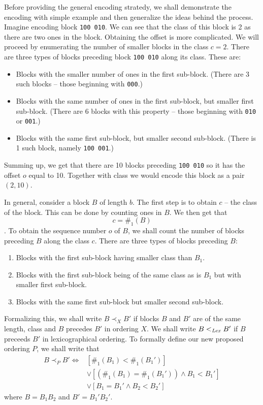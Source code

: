 Before providing the general encoding stratedy, we shall demonstrate the encoding with
simple example and then generalize the ideas behind the process. Imagine encoding
block {\tt 100 010}. We can see that the class of this block is 2 as there are two ones in
the block. Obtaining the offset is more complicated. We will proceed by enumerating the
number of smaller blocks in the class $c=2$. There are three types of blocks preceding
block {\tt 100 010} along its class. These are:

\begin{itemize}
    \item Blocks with the smaller number of ones in the first sub-block.
    (There are 3 such blocks -- those beginning with {\tt 000}.)
    \item Blocks with the same number of ones in the first sub-block, but smaller first sub-block.
    (There are 6 blocks with this property -- those beginning with {\tt 010} or {\tt 001}.)
    \item Blocks with the same first sub-block, but smaller second sub-block.
    (There is 1 such block, namely {\tt 100 001}.)
\end{itemize}

Summing up, we get that there are 10 blocks preceding {\tt 100 010} so it has the offset $o$
equal to 10. Together with class we would encode this block as a pair $(2, 10)$.

In general, consider a block $B$ of length $b$. The first step is to obtain
$c$ -- the class of the block. This can be done by counting ones in $B$. We
then get that $$c=\#_1(B)$$. To obtain the sequence number $o$ of $B$, we shall
count the number of blocks preceding $B$ along the class $c$. There are three
types of blocks preceding $B$:

\begin{enumerate}
    \item Blocks with the first sub-block having smaller class than $B_1$.
    \label{chapter3:encoding:1}
    \item Blocks with the first sub-block being of the same class as is $B_1$
    but with smaller first sub-block. \label{chapter3:encoding:2}
    \item Blocks with the same first sub-block but smaller second sub-block.
    \label{chapter3:encoding:3}
\end{enumerate}

Formalizing this, we shall write $B\prec_X B'$ if blocks $B$ and $B'$ are of
the same length, class and $B$ precedes $B'$ in ordering $X$. We shall
write $B<_{\mathit{Lex}} B'$ if $B$ preceeds $B'$ in lexicographical ordering.
To formally define our new proposed ordering $P$, we shall write that
\begin{align*}
    B\prec_P B' \iff
    &[\#_1(B_1) < \#_1(B_1')] \\
    &\lor [(\#_1(B_1) = \#_1(B_1')) \land B_1 < B_1']\\
    &\lor [B_1 = B_1' \land B_2 < B_2']
\end{align*}
where $B=B_1B_2$ and $B'=B_1'B_2'$.

